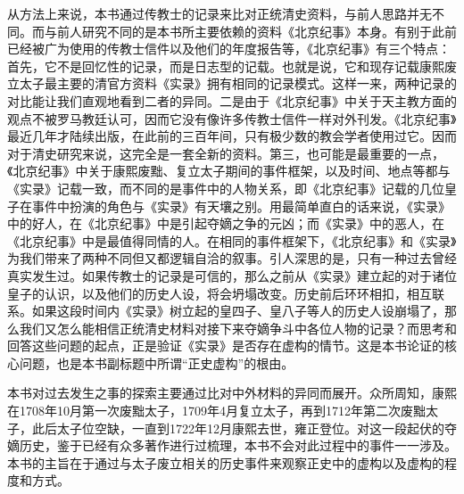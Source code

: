 
从方法上来说，本书通过传教士的记录来比对正统清史资料，与前人思路并无不同。而与前人研究不同的是本书所主要依赖的资料《北京纪事》本身。有别于此前已经被广为使用的传教士信件以及他们的年度报告等，《北京纪事》有三个特点：首先，它不是回忆性的记录，而是日志型的记载。也就是说，它和现存记载康熙废立太子最主要的清官方资料《实录》拥有相同的记录模式。这样一来，两种记录的对比能让我们直观地看到二者的异同。二是由于《北京纪事》中关于天主教方面的观点不被罗马教廷认可，因而它没有像许多传教士信件一样对外刊发。《北京纪事》最近几年才陆续出版，在此前的三百年间，只有极少数的教会学者使用过它。因而对于清史研究来说，这完全是一套全新的资料。第三，也可能是最重要的一点，《北京纪事》中关于康熙废黜、复立太子期间的事件框架，以及时间、地点等都与《实录》记载一致，而不同的是事件中的人物关系，即《北京纪事》记载的几位皇子在事件中扮演的角色与《实录》有天壤之别。用最简单直白的话来说，《实录》中的好人，在《北京纪事》中是引起夺嫡之争的元凶；而《实录》中的恶人，在《北京纪事》中是最值得同情的人。在相同的事件框架下，《北京纪事》和《实录》为我们带来了两种不同但又都逻辑自洽的叙事。引人深思的是，只有一种过去曾经真实发生过。如果传教士的记录是可信的，那么之前从《实录》建立起的对于诸位皇子的认识，以及他们的历史人设，将会坍塌改变。历史前后环环相扣，相互联系。如果这段时间内《实录》树立起的皇四子、皇八子等人的历史人设崩塌了，那么我们又怎么能相信正统清史材料对接下来夺嫡争斗中各位人物的记录？而思考和回答这些问题的起点，正是验证《实录》是否存在虚构的情节。这是本书论证的核心问题，也是本书副标题中所谓“正史虚构”的根由。



本书对过去发生之事的探索主要通过比对中外材料的异同而展开。众所周知，康熙在1708年10月第一次废黜太子，1709年4月复立太子，再到1712年第二次废黜太子，此后太子位空缺，一直到1722年12月康熙去世，雍正登位。对这一段起伏的夺嫡历史，鉴于已经有众多著作进行过梳理，本书不会对此过程中的事件一一涉及。本书的主旨在于通过与太子废立相关的历史事件来观察正史中的虚构以及虚构的程度和方式。


